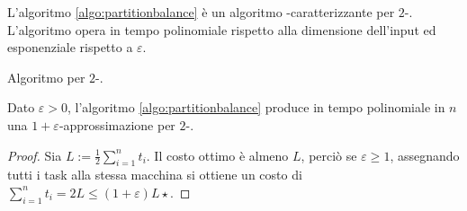 L'algoritmo \ref{algo:partitionbalance} è un algoritmo \PTAS-caratterizzante per $2$-\LoadBalancing.
L'algoritmo opera in tempo polinomiale rispetto alla dimensione dell'input ed esponenziale rispetto a $\varepsilon$.

\begin{algorithm}
	\caption{Algoritmo \PTAS per $2$-\LoadBalancing.}
	\label{algo:partitionbalance}
	
\end{algorithm}

\begin{theorem}
	Dato $\varepsilon>0$, l'algoritmo \ref{algo:partitionbalance} produce in tempo polinomiale in $n$ una $1+\varepsilon$-approssimazione per $2$-\LoadBalancing.
\end{theorem}
\begin{proof}
	Sia $L:=\frac12\sum_{i=1}^n t_i$.
	Il costo ottimo è almeno $L$, perciò se $\varepsilon\geq1$, assegnando tutti i task alla stessa macchina si ottiene un costo di $\sum_{i=1}^n t_i=2L\leq(1+\varepsilon)L\star$.


\end{proof}
